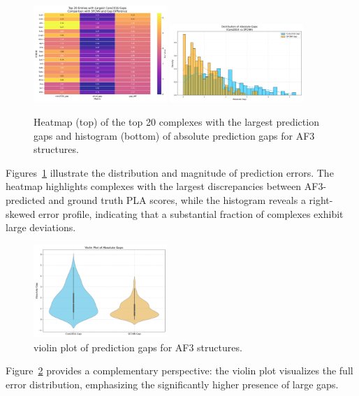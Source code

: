 \documentclass[unnumsec,webpdf,contemporary,large]{oup-authoring-template}
\theoremstyle{thmstyleone}%
\theoremstyle{thmstyletwo}%
\theoremstyle{thmstylethree}%
\begin{document}
\begin{figure}[H]
    \centering
    \includegraphics[width=0.45\textwidth]{images/top20_heatmap.png}
    \includegraphics[width=0.45\textwidth]{images/gap_histogram.png}
    \caption{Heatmap (top) of the top 20 complexes with the largest prediction gaps and histogram (bottom) of absolute prediction gaps for AF3 structures.}
    \label{fig:af3_heatmap_hist}
\end{figure}

Figures~\ref{fig:af3_heatmap_hist} illustrate the distribution and magnitude of prediction errors. The heatmap highlights complexes with the largest discrepancies between AF3-predicted and ground truth PLA scores, while the histogram reveals a right-skewed error profile, indicating that a substantial fraction of complexes exhibit large deviations.

\begin{figure}[H]
    \centering
    \includegraphics[width=0.45\textwidth]{images/gap_violinplot.png}
    \caption{violin plot of prediction gaps for AF3 structures.}
    \label{fig:af3_gap_violin}
\end{figure}

Figure~\ref{fig:af3_gap_violin} provides a complementary perspective: 
the violin plot visualizes the full error distribution, 
emphasizing the significantly higher presence of large gaps.
\end{document}
